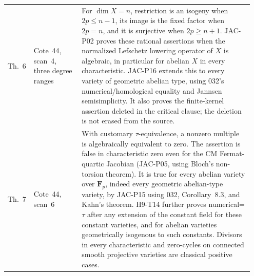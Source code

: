 \begin{longtable}{@{}p{0.08\linewidth}p{0.19\linewidth}p{0.68\linewidth}@{}}
Th.~6 & Cote~44, scan~4, three degree ranges &
For $\dim X=n$, restriction is an isogeny when $2p\le n-1$,
its image is the fixed factor when $2p=n$, and it is surjective
when $2p\ge n+1$. JAC-P02 proves these rational assertions when
the normalized Lefschetz lowering operator of $X$ is algebraic,
in particular for abelian $X$ in every characteristic. JAC-P16
extends this to every variety of geometric abelian type, using
032's numerical/homological equality and Jannsen semisimplicity. It also
proves the finite-kernel assertion deleted in the critical clause;
the deletion is not erased from the source.\\

Th.~7 & Cote~44, scan~6 &
With customary $\tau$-equivalence, a nonzero multiple is
algebraically equivalent to zero. The assertion is false in
characteristic zero even for the CM Fermat-quartic Jacobian
(JAC-P05, using Bloch's non-torsion theorem).
It is true for every abelian variety over $\overline{\mathbf F}_p$,
indeed every geometric abelian-type variety, by JAC-P15 using
032, Corollary~8.3, and Kahn's theorem. H9-T14 further proves
numerical=$\tau$ after any extension of the constant field for
these constant varieties, and for abelian varieties geometrically
isogenous to such constants. Divisors in every
characteristic and zero-cycles on connected smooth projective
varieties are classical positive cases.\\
\bottomrule
\end{longtable}
\endgroup

